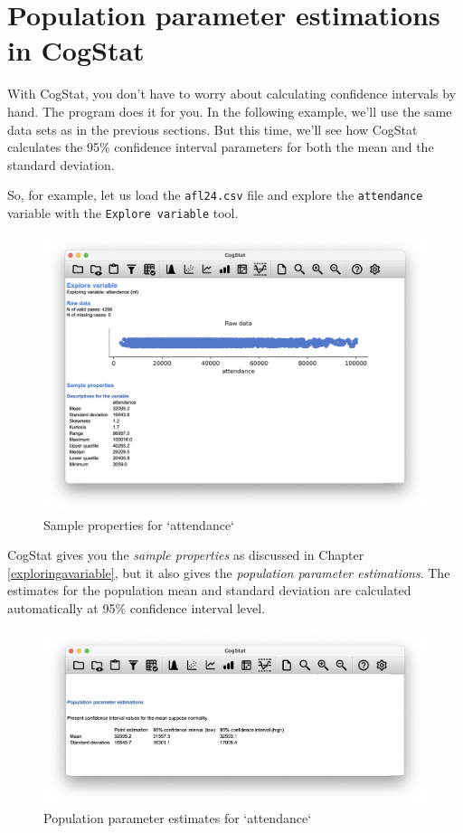 \documentclass[
]{book}
\theoremstyle{definition}
\theoremstyle{definition}
\theoremstyle{definition}
\theoremstyle{definition}
\theoremstyle{remark}
\begin{document}
\hypertarget{population-parameter-estimations-in-cogstat}{%
\section{Population parameter estimations in CogStat}\label{population-parameter-estimations-in-cogstat}}

With CogStat, you don't have to worry about calculating confidence intervals by hand. The program does it for you. In the following example, we'll use the same data sets as in the previous sections. But this time, we'll see how CogStat calculates the 95\% confidence interval parameters for both the mean and the standard deviation.

So, for example, let us load the \texttt{afl24.csv} file and explore the \texttt{attendance} variable with the \texttt{Explore\ variable} tool.

\begin{figure}

{\centering \includegraphics[width=0.66\linewidth]{resources/image/cogstatattendancesample} 

}

\caption{Sample properties for `attendance`}\label{fig:unnamed-chunk-27}
\end{figure}

CogStat gives you the \emph{sample properties} as discussed in Chapter \ref{exploringavariable}, but it also gives the \emph{population parameter estimations}. The estimates for the population mean and standard deviation are calculated automatically at 95\% confidence interval level.

\begin{figure}

{\centering \includegraphics[width=0.66\linewidth]{resources/image/cogstatattendancepopulation} 

}

\caption{Population parameter estimates for `attendance`}\label{fig:unnamed-chunk-28}
\end{figure}
\end{document}
